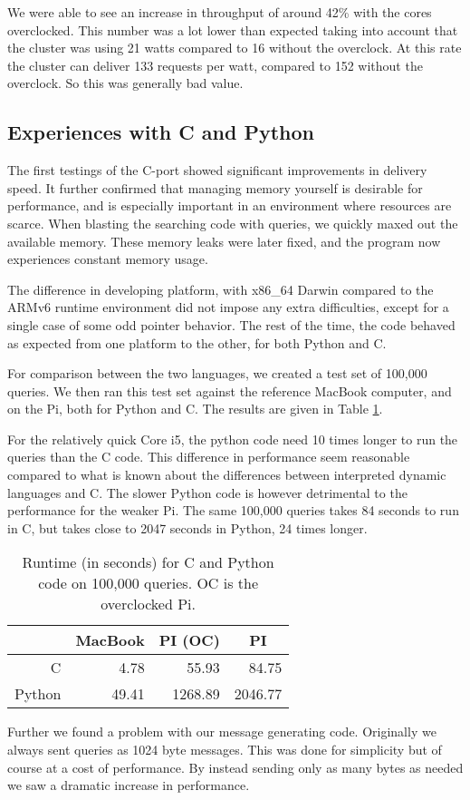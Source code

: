 We were able to see an increase in throughput of around 42\% with the cores overclocked. This number was a lot lower than expected taking into account that the cluster was using 21 watts compared to 16 without the overclock. At this rate the cluster can deliver 133 requests per watt, compared to 152 without the overclock. So this was generally bad value.


\subsection{Experiences with {C} and Python}
The first testings of the C-port showed significant improvements in delivery speed.
It further confirmed that managing memory yourself is desirable for performance, and is especially important in an environment where resources are scarce.
When blasting the searching code with queries, we quickly maxed out the available memory.
These memory leaks were later fixed, and the program now experiences constant memory usage.

The difference in developing platform, with x86\_64 Darwin compared to the ARMv6 runtime environment did not impose any extra difficulties, except for a single case of some odd pointer behavior.
The rest of the time, the code behaved as expected from one platform to the other, for both Python and C.

For comparison between the two languages, we created a test set of 100,000 queries. We then ran this test set against the reference MacBook computer, and on the Pi, both for Python and {C}.
The results are given in Table \ref{tbl:runtimes_ports}.

For the relatively quick {Core i5}, the python code need 10 times longer to run the queries than the C code. This difference in performance seem reasonable compared to what is known about the differences between interpreted dynamic languages and C.
The slower Python code is however detrimental to the performance for the weaker Pi. The same 100,000 queries takes 84 seconds to run in C, but takes close to 2047 seconds in Python, 24 times longer.

\begin{table}[h]
    \begin{center}
    \begin{tabular}{|r|r|r|r|}
    \hline
       & \multicolumn{1}{|c|}{MacBook} & \multicolumn{1}{|c|}{PI (OC)}  & \multicolumn{1}{|c|}{PI} \\
    \hline
    C      & 4.78 & 55.93 & 84.75     \\
    \hline
    Python & 49.41 & 1268.89 & 2046.77   \\

    \hline
    \end{tabular}
    \caption{Runtime (in seconds) for C and Python code on 100,000 queries. OC is the overclocked Pi.}
    \label{tbl:runtimes_ports}
    \end{center}
\end{table}

Further we found a problem with our message generating code. Originally we always sent queries as 1024 byte messages. This was done for simplicity but of course at a cost of performance. By instead sending only as many bytes as needed we saw a dramatic increase in performance.











